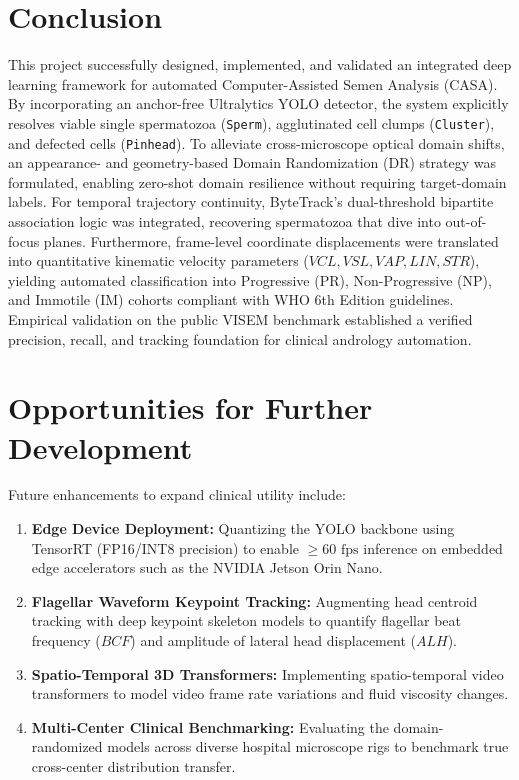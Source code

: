 \documentclass[12pt,a4paper]{report}
\begin{document}
\section{Conclusion}
This project successfully designed, implemented, and validated an integrated deep learning framework for automated Computer-Assisted Semen Analysis (CASA). By incorporating an anchor-free Ultralytics YOLO detector, the system explicitly resolves viable single spermatozoa (\texttt{Sperm}), agglutinated cell clumps (\texttt{Cluster}), and defected cells (\texttt{Pinhead}). To alleviate cross-microscope optical domain shifts, an appearance- and geometry-based Domain Randomization (DR) strategy was formulated, enabling zero-shot domain resilience without requiring target-domain labels. For temporal trajectory continuity, ByteTrack's dual-threshold bipartite association logic was integrated, recovering spermatozoa that dive into out-of-focus planes. Furthermore, frame-level coordinate displacements were translated into quantitative kinematic velocity parameters ($VCL, VSL, VAP, LIN, STR$), yielding automated classification into Progressive (PR), Non-Progressive (NP), and Immotile (IM) cohorts compliant with WHO 6th Edition guidelines. Empirical validation on the public VISEM benchmark established a verified precision, recall, and tracking foundation for clinical andrology automation.

\section{Opportunities for Further Development}
Future enhancements to expand clinical utility include:
\begin{enumerate}
    \item \textbf{Edge Device Deployment:} Quantizing the YOLO backbone using TensorRT (FP16/INT8 precision) to enable $\ge 60\text{ fps}$ inference on embedded edge accelerators such as the NVIDIA Jetson Orin Nano.
    \item \textbf{Flagellar Waveform Keypoint Tracking:} Augmenting head centroid tracking with deep keypoint skeleton models to quantify flagellar beat frequency ($BCF$) and amplitude of lateral head displacement ($ALH$).
    \item \textbf{Spatio-Temporal 3D Transformers:} Implementing spatio-temporal video transformers to model video frame rate variations and fluid viscosity changes.
    \item \textbf{Multi-Center Clinical Benchmarking:} Evaluating the domain-randomized models across diverse hospital microscope rigs to benchmark true cross-center distribution transfer.
\end{enumerate}
\end{document}
